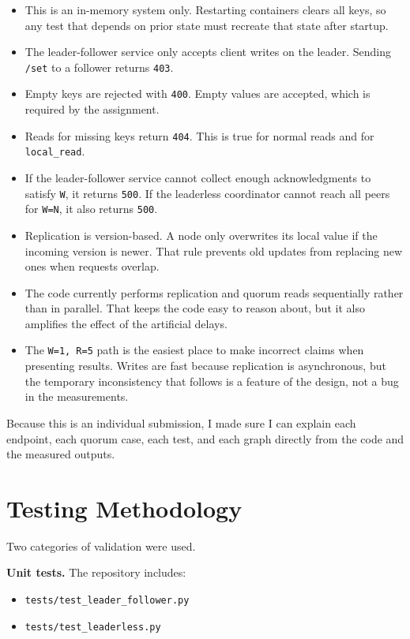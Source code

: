 \documentclass[11pt]{article}
\begin{document}
\begin{itemize}
\item This is an in-memory system only. Restarting containers clears all keys, so any test that depends on prior state must recreate that state after startup.
\item The leader-follower service only accepts client writes on the leader. Sending \texttt{/set} to a follower returns \texttt{403}.
\item Empty keys are rejected with \texttt{400}. Empty values are accepted, which is required by the assignment.
\item Reads for missing keys return \texttt{404}. This is true for normal reads and for \texttt{local\_read}.
\item If the leader-follower service cannot collect enough acknowledgments to satisfy \texttt{W}, it returns \texttt{500}. If the leaderless coordinator cannot reach all peers for \texttt{W=N}, it also returns \texttt{500}.
\item Replication is version-based. A node only overwrites its local value if the incoming version is newer. That rule prevents old updates from replacing new ones when requests overlap.
\item The code currently performs replication and quorum reads sequentially rather than in parallel. That keeps the code easy to reason about, but it also amplifies the effect of the artificial delays.
\item The \texttt{W=1, R=5} path is the easiest place to make incorrect claims when presenting results. Writes are fast because replication is asynchronous, but the temporary inconsistency that follows is a feature of the design, not a bug in the measurements.
\end{itemize}

Because this is an individual submission, I made sure I can explain each endpoint, each quorum case, each test, and each graph directly from the code and the measured outputs.

\section{Testing Methodology}

Two categories of validation were used.

\textbf{Unit tests.} The repository includes:
\begin{itemize}
\item \texttt{tests/test\_leader\_follower.py}
\item \texttt{tests/test\_leaderless.py}
\end{itemize}
\end{document}
